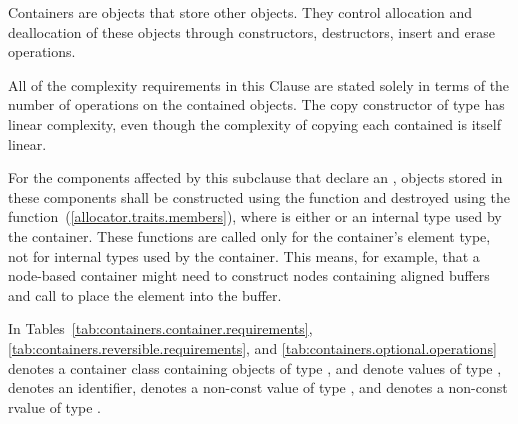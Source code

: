 \pnum
Containers are objects that store other objects.
They control allocation and deallocation of these objects
through constructors, destructors, insert and erase operations.

\pnum
All of the complexity requirements in this Clause are stated solely
in terms of the number of operations on the contained objects.
\enterexample
The copy constructor of type
has linear complexity,
even though the complexity of copying each contained
is itself linear.
\exitexample

\pnum
For the components affected by this subclause that declare an ,
objects stored in these components shall be constructed using the
 function
and destroyed using the
function~(\ref{allocator.traits.members}),
where  is either  or
an internal type used by the container.
These functions are called only for the
container's element type, not for internal types used by the container. \enternote This
means, for example, that a node-based container might need to construct nodes containing
aligned buffers and call  to place the element into the buffer.
\exitnote

\pnum
In Tables~\ref{tab:containers.container.requirements},
\ref{tab:containers.reversible.requirements}, and
\ref{tab:containers.optional.operations}
 denotes a container class containing objects of type
,  and 
denote values of type , 
denotes an identifier,  denotes
a non-const value of type , and 
denotes a non-const rvalue of type .

